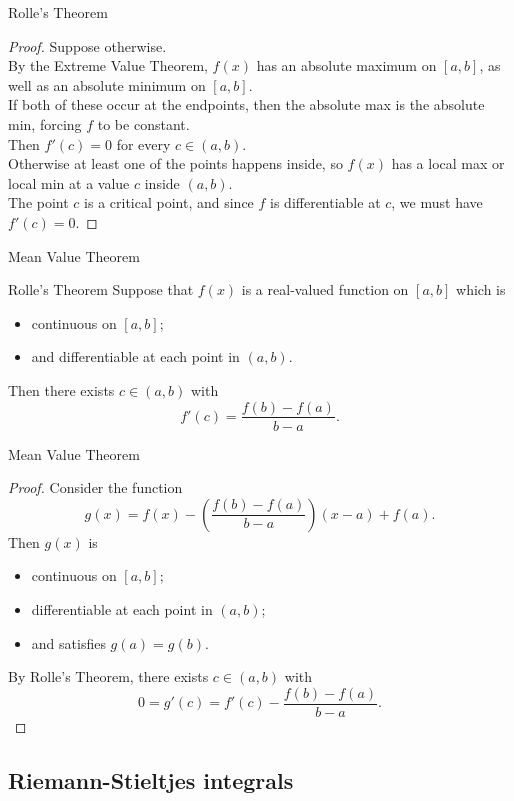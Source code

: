 \documentclass{beamer}
\begin{document}
\begin{frame}{Rolle's Theorem}
\begin{proof}
Suppose otherwise.\\
\pause
By the Extreme Value Theorem, $f(x)$ has an absolute maximum on $[a,b]$, as well as an absolute minimum on $[a,b]$.\\
\pause
If both of these occur at the endpoints, then the absolute max is the absolute min, forcing $f$ to be constant.\\
\pause
Then $f'(c)=0$ for every $c\in (a,b)$.\\
\pause
Otherwise at least one of the points happens inside, so $f(x)$ has a local max or local min at a value $c$ inside $(a,b)$.\\
\pause
The point $c$ is a critical point, and since $f$ is differentiable at $c$, we must have $f'(c)=0$.
\end{proof}
\end{frame}

\begin{frame}{Mean Value Theorem}
\begin{thm}{Rolle's Theorem}
Suppose that $f(x)$ is a real-valued function on $[a,b]$ which is
\begin{itemize}
\pause
\item continuous on $[a,b]$;
\pause
\item and differentiable at each point in $(a,b)$.
\end{itemize}
\pause
Then there exists $c\in (a,b)$ with
$$f'(c) = \frac{f(b)-f(a)}{b-a}.$$
\end{thm}
\end{frame}

\begin{frame}{Mean Value Theorem}
\begin{proof}
Consider the function
$$g(x) = f(x)-\left(\frac{f(b)-f(a)}{b-a}\right)(x-a) + f(a).$$
\pause
Then $g(x)$ is
\begin{itemize}
\pause
\item continuous on $[a,b]$;
\pause
\item differentiable at each point in $(a,b)$;
\pause
\item and satisfies $g(a) = g(b)$.
\end{itemize}
\pause
By Rolle's Theorem, there exists $c\in (a,b)$ with
$$0 = g'(c) = f'(c) -\frac{f(b)-f(a)}{b-a}.$$
\end{proof}
\end{frame}

\subsection{Riemann-Stieltjes integrals}
\end{document}
